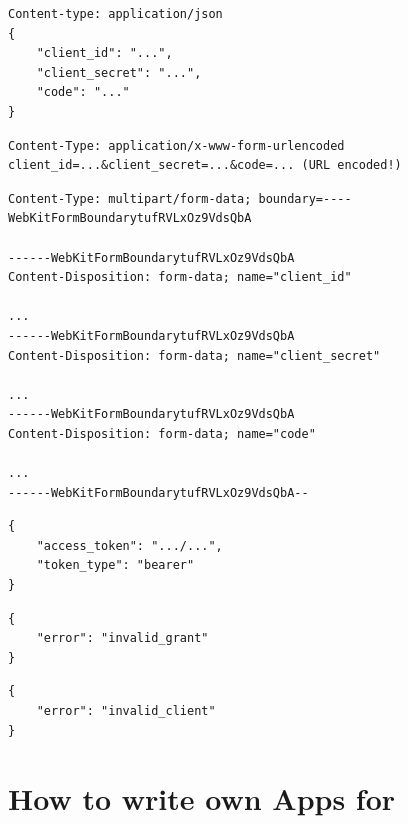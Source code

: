 \begin{lstlisting}[caption=Request of Access token via Authorization code (JSON format),basicstyle=\small,columns=fullflexible]
Content-type: application/json
{
    "client_id": "...",
    "client_secret": "...",
    "code": "..."
}
\end{lstlisting}

\begin{lstlisting}[caption=Request of Access token via Authorization code (URL encoded form),basicstyle=\small,columns=fullflexible]
Content-Type: application/x-www-form-urlencoded
client_id=...&client_secret=...&code=... (URL encoded!)
\end{lstlisting}

\begin{lstlisting}[caption=Request of Access token via Authorization code (form data),basicstyle=\small,columns=fullflexible]
Content-Type: multipart/form-data; boundary=----WebKitFormBoundarytufRVLxOz9VdsQbA

------WebKitFormBoundarytufRVLxOz9VdsQbA
Content-Disposition: form-data; name="client_id"

...
------WebKitFormBoundarytufRVLxOz9VdsQbA
Content-Disposition: form-data; name="client_secret"

...
------WebKitFormBoundarytufRVLxOz9VdsQbA
Content-Disposition: form-data; name="code"

...
------WebKitFormBoundarytufRVLxOz9VdsQbA--
\end{lstlisting}

\begin{lstlisting}[caption=Access token successfuly retrieved,basicstyle=\small,columns=fullflexible]
{
    "access_token": ".../...",
    "token_type": "bearer"
}
\end{lstlisting}

\begin{lstlisting}[caption=Authorization code is invalid (400 Bad request),basicstyle=\small,columns=fullflexible]
{
    "error": "invalid_grant"
}
\end{lstlisting}

\begin{lstlisting}[caption=Wrong credentials (400 Bad request),basicstyle=\small,columns=fullflexible]
{
    "error": "invalid_client"
}
\end{lstlisting}


\section{How to write own Apps for \zway}
\label{developownapps}

